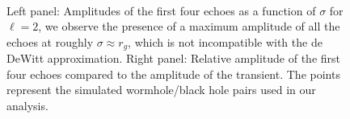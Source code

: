 \documentclass[article,aps,nofootinbib,twocolumn,superscriptaddress]{revtex4-1}
\begin{document}
\begin{figure}
\centering
{} \,
\caption{\label{fig:echo_sigma} Left panel: Amplitudes of the first four echoes as a function of $\sigma$ for $\ell=2$, we observe the presence of a maximum amplitude of all the echoes at roughly $\sigma\approx r_g$, which is not incompatible with the de DeWitt approximation. Right panel: Relative amplitude of the first four echoes compared to the amplitude of the transient. The points represent the simulated wormhole/black hole pairs used in our analysis.} 
\end{figure}
\end{document}

